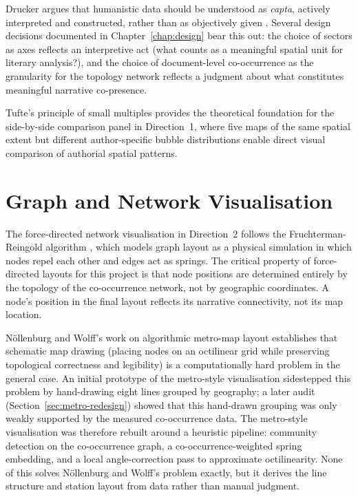 \documentclass[logo,msc]{infthesis}
\begin{document}
Drucker argues that humanistic data should be understood as \emph{capta}, actively interpreted and constructed, rather than as objectively given \cite{drucker2011}. Several design decisions documented in Chapter~\ref{chap:design} bear this out: the choice of sectors as axes reflects an interpretive act (what counts as a meaningful spatial unit for literary analysis?), and the choice of document-level co-occurrence as the granularity for the topology network reflects a judgment about what constitutes meaningful narrative co-presence.
 
Tufte's principle of small multiples \cite{tufte1983} provides the theoretical foundation for the side-by-side comparison panel in Direction~1, where five maps of the same spatial extent but different author-specific bubble distributions enable direct visual comparison of authorial spatial patterns.
 
\section{Graph and Network Visualisation}
 
The force-directed network visualisation in Direction~2 follows the Fruchterman-Reingold algorithm \cite{fruchterman1991}, which models graph layout as a physical simulation in which nodes repel each other and edges act as springs. The critical property of force-directed layouts for this project is that node positions are determined entirely by the topology of the co-occurrence network, not by geographic coordinates. A node's position in the final layout reflects its narrative connectivity, not its map location.
 
N{\"o}llenburg and Wolff's work on algorithmic metro-map layout \cite{nollenburg2006} establishes that schematic map drawing (placing nodes on an octilinear grid while preserving topological correctness and legibility) is a computationally hard problem in the general case. An initial prototype of the metro-style visualisation sidestepped this problem by hand-drawing eight lines grouped by geography; a later audit (Section~\ref{sec:metro-redesign}) showed that this hand-drawn grouping was only weakly supported by the measured co-occurrence data. The metro-style visualisation was therefore rebuilt around a heuristic pipeline: community detection on the co-occurrence graph, a co-occurrence-weighted spring embedding, and a local angle-correction pass to approximate octilinearity. None of this solves N{\"o}llenburg and Wolff's problem exactly, but it derives the line structure and station layout from data rather than manual judgment.
 
\end{document}
